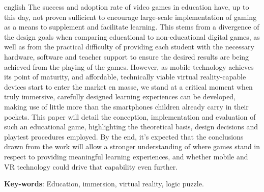 \begin{resumo}[Abstract]
 \begin{otherlanguage*}{english}
   The success and adoption rate of video games in education have, up to this day, not proven sufficient to encourage large-scale implementation of gaming as a means to supplement and facilitate learning. This stems from a divergence of the design goals when comparing educational to non-educational digital games, as well as from the practical difficulty of providing each student with the necessary hardware, software and teacher support to ensure the desired results are being achieved from the playing of the games. However, as mobile technology achieves its point of maturity, and affordable, technically viable virtual reality-capable devices start to enter the market en masse, we stand at a critical moment when truly immersive, carefully designed learning experiences can be developed, making use of little more than the smartphones children already carry in their pockets. This paper will detail the conception, implementation and evaluation of such an educational game, highlighting the theoretical basis, design decisions and playtest procedures employed. By the end, it’s expected that the conclusions drawn from the work will allow a stronger understanding of where games stand in respect to providing meaningful learning experiences, and whether mobile and VR technology could drive that capability even further.

    \vspace{\onelineskip}

    \noindent
    \textbf{Key-words}: Education, immersion, virtual reality, logic puzzle.
  \end{otherlanguage*}
\end{resumo}